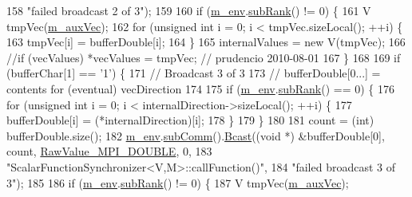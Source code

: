 \begin{DoxyCode}
158                               \textcolor{stringliteral}{"failed broadcast 2 of 3"});
159 
160         \textcolor{keywordflow}{if} (\hyperlink{class_q_u_e_s_o_1_1_scalar_function_synchronizer_aa77a3d3b53267ef7c731836faaa082fb}{m\_env}.\hyperlink{class_q_u_e_s_o_1_1_base_environment_a172d52f993f1322ed45aaddf71518dbb}{subRank}() != 0) \{
161           V tmpVec(\hyperlink{class_q_u_e_s_o_1_1_scalar_function_synchronizer_adbd43aee6de557012924f3e18660a4f3}{m\_auxVec});
162           \textcolor{keywordflow}{for} (\textcolor{keywordtype}{unsigned} \textcolor{keywordtype}{int} i = 0; i < tmpVec.sizeLocal(); ++i) \{
163             tmpVec[i] = bufferDouble[i];
164           \}
165           internalValues = \textcolor{keyword}{new} V(tmpVec);
166           \textcolor{comment}{//if (vecValues) *vecValues = tmpVec; // prudencio 2010-08-01}
167         \}
168 
169         \textcolor{keywordflow}{if} (bufferChar[1] == \textcolor{charliteral}{'1'}) \{
171           \textcolor{comment}{// Broadcast 3 of 3}
173 \textcolor{comment}{}          \textcolor{comment}{// bufferDouble[0...] = contents for (eventual) vecDirection}
174 
175           \textcolor{keywordflow}{if} (\hyperlink{class_q_u_e_s_o_1_1_scalar_function_synchronizer_aa77a3d3b53267ef7c731836faaa082fb}{m\_env}.\hyperlink{class_q_u_e_s_o_1_1_base_environment_a172d52f993f1322ed45aaddf71518dbb}{subRank}() == 0) \{
176             \textcolor{keywordflow}{for} (\textcolor{keywordtype}{unsigned} \textcolor{keywordtype}{int} i = 0; i < internalDirection->sizeLocal(); ++i) \{
177               bufferDouble[i] = (*internalDirection)[i];
178             \}
179           \}
180 
181           count = (int) bufferDouble.size();
182           \hyperlink{class_q_u_e_s_o_1_1_scalar_function_synchronizer_aa77a3d3b53267ef7c731836faaa082fb}{m\_env}.\hyperlink{class_q_u_e_s_o_1_1_base_environment_affe39f53e3d5d678842413370af09145}{subComm}().\hyperlink{class_q_u_e_s_o_1_1_mpi_comm_abd6af8db8b0c7fd2f5b62e26477a9537}{Bcast}((\textcolor{keywordtype}{void} *) &bufferDouble[0], count, 
      \hyperlink{_mpi_comm_8h_ad0f503bd9fecfe4e570ca3d15aaf2518}{RawValue\_MPI\_DOUBLE}, 0,
183                                 \textcolor{stringliteral}{"ScalarFunctionSynchronizer<V,M>::callFunction()"},
184                                 \textcolor{stringliteral}{"failed broadcast 3 of 3"});
185 
186           \textcolor{keywordflow}{if} (\hyperlink{class_q_u_e_s_o_1_1_scalar_function_synchronizer_aa77a3d3b53267ef7c731836faaa082fb}{m\_env}.\hyperlink{class_q_u_e_s_o_1_1_base_environment_a172d52f993f1322ed45aaddf71518dbb}{subRank}() != 0) \{
187             V tmpVec(\hyperlink{class_q_u_e_s_o_1_1_scalar_function_synchronizer_adbd43aee6de557012924f3e18660a4f3}{m\_auxVec});

\end{DoxyCode}

